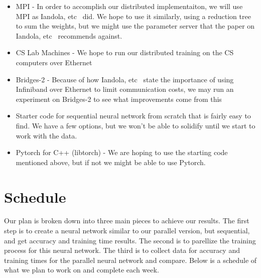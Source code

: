 \documentclass[11pt]{article}
\begin{document}
\begin{itemize}
    \item MPI - In order to accomplish our distributed implementaiton, we will use MPI as Iandola, etc~\cite{iandola2016firecaffe} did. We hope to use it similarly, using a reduction tree to sum the weights, but we might use the parameter server that the paper on Iandola, etc~\cite{iandola2016firecaffe} recommends against. 
    \item CS Lab Machines - We hope to run our distributed training on the CS computers over Ethernet
    \item Bridges-2 - Because of how Iandola, etc~\cite{iandola2016firecaffe} state the importance of using Infiniband over Ethernet to limit communication costs, we may run an experiment on Bridges-2 to see what improvements come from this
    \item Starter code for sequential neural network from scratch that is fairly easy to find. We have a few options, but we won't be able to solidify until we start to work with the data.
    \item Pytorch for C++ (libtorch) - We are hoping to use the starting code mentioned above, but if not we might be able to use Pytorch.
    
\end{itemize}

\section {Schedule}\label{sched}

Our plan is broken down into three main pieces to achieve our results. 
The first step is to create a neural network similar to our parallel version, 
but sequential, and get accuracy and training time results. The second is to
parellize the training process for this neural network. The third is to collect
data for accuracy and training times for the parallel neural network and 
compare. Below is a schedule of what we plan to work on and complete each week.  
\end{document}
